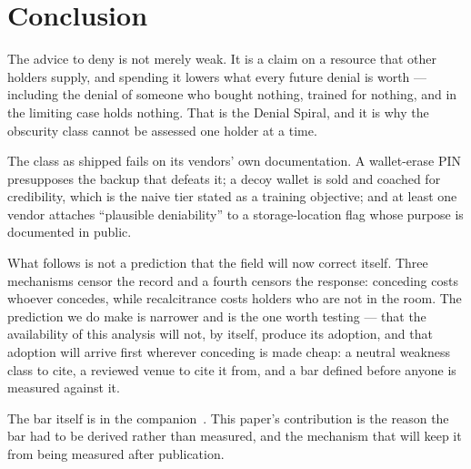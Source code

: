 \section{Conclusion}
\label{sec:conclusion}

The advice to deny is not merely weak. It is a claim on a resource that other
holders supply, and spending it lowers what every future denial is worth ---
including the denial of someone who bought nothing, trained for nothing, and in
the limiting case holds nothing. That is the Denial Spiral, and it is why the
obscurity class cannot be assessed one holder at a time.

The class as shipped fails on its vendors' own documentation. A wallet-erase PIN
presupposes the backup that defeats it; a decoy wallet is sold and coached for
credibility, which is the naive tier stated as a training objective; and at least
one vendor attaches ``plausible deniability'' to a storage-location flag whose
purpose is documented in public.

What follows is not a prediction that the field will now correct itself. Three
mechanisms censor the record and a fourth censors the response: conceding costs
whoever concedes, while recalcitrance costs holders who are not in the room. The
prediction we do make is narrower and is the one worth testing --- that the
availability of this analysis will not, by itself, produce its adoption, and that
adoption will arrive first wherever conceding is made cheap: a neutral weakness
class to cite, a reviewed venue to cite it from, and a bar defined before anyone
is measured against it.

The bar itself is in the companion~\cite{deadly-race}. This paper's contribution
is the reason the bar had to be derived rather than measured, and the mechanism
that will keep it from being measured after publication.
